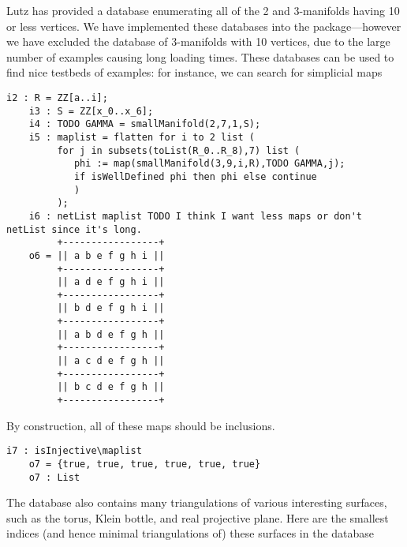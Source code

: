 \documentclass[12pt,leqno]{amsart}
\theoremstyle{definition}
\newenvironment{example}
{\pushQED{\qed}\renewcommand{\qedsymbol}{$\diamond$}\examplex}
{\popQED\endexamplex}
\begin{document}
Lutz has provided a database enumerating all of the 2 and 3-manifolds having 10 or less vertices. We have implemented these databases into the package---however we have excluded the database of 3-manifolds with 10 vertices, due to the large number of examples causing long loading times.
\begin{example}\label{example of using database}
  These databases can be used to find nice testbeds of examples: for instance, we can search for simplicial maps
  \begin{lstlisting}[basicstyle={\ttfamily \scriptsize}, xleftmargin=-23pt]
    i2 : R = ZZ[a..i];
    i3 : S = ZZ[x_0..x_6];
    i4 : TODO GAMMA = smallManifold(2,7,1,S);
    i5 : maplist = flatten for i to 2 list (
         for j in subsets(toList(R_0..R_8),7) list (
         	phi := map(smallManifold(3,9,i,R),TODO GAMMA,j);
         	if isWellDefined phi then phi else continue
         	)
         );
    i6 : netList maplist TODO I think I want less maps or don't netList since it's long.
         +-----------------+
    o6 = || a b e f g h i ||
         +-----------------+
         || a d e f g h i ||
         +-----------------+
         || b d e f g h i ||
         +-----------------+
         || a b d e f g h ||
         +-----------------+
         || a c d e f g h ||
         +-----------------+
         || b c d e f g h ||
         +-----------------+
  \end{lstlisting}
  By construction, all of these maps should be inclusions.
  \begin{lstlisting}[basicstyle={\ttfamily \scriptsize}, xleftmargin=-23pt]
    i7 : isInjective\maplist
    o7 = {true, true, true, true, true, true}
    o7 : List
  \end{lstlisting}
\end{example}
The database also contains many triangulations of various interesting surfaces, such as the torus, Klein bottle, and real projective plane. Here are the smallest indices (and hence minimal triangulations of) these surfaces in the database
\end{document}
